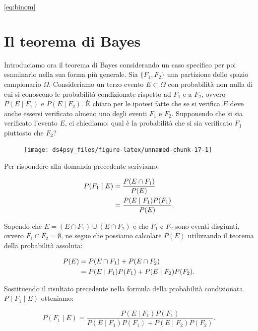 \documentclass[
  11pt,
]{krantz}
\theoremstyle{definition}
\theoremstyle{definition}
\theoremstyle{definition}
\theoremstyle{definition}
\theoremstyle{remark}
\begin{document}
\eqref{eq:binom}

\hypertarget{il-teorema-di-bayes}{%
\section{Il teorema di Bayes}\label{il-teorema-di-bayes}}

Introduciamo ora il teorema di Bayes considerando un caso specifico per poi esaminarlo nella sua forma più generale. Sia \(\{F_1, F_2\}\) una partizione dello spazio campionario \(\Omega\). Consideriamo un terzo evento \(E \subset \Omega\) con probabilità non nulla di cui si conoscono le probabilità condizionate rispetto ad \(F_1\) e a \(F_2\), ovvero \(P(E \mid F_1)\) e \(P(E \mid F_2)\). È chiaro per le ipotesi fatte che se si verifica \(E\) deve anche essersi verificato almeno uno degli eventi \(F_1\) e \(F_2\). Supponendo che si sia verificato l'evento \(E\), ci chiediamo: qual è la probabilità che si sia verificato \(F_1\) piuttosto che \(F_2\)?

\begin{figure}[h]

{\centering \texttt{[image: ds4psy\_files/figure-latex/unnamed-chunk-17-1]} 

}

\end{figure}

Per rispondere alla domanda precedente scriviamo:

\[
\begin{split}
P(F_1 \mid E) &= \frac{P(E \cap F_1)}{P(E)}\notag\\
              &= \frac{P(E \mid F_1)P(F_1)}{P(E)}.
\end{split}
\]

Sapendo che \(E = (E \cap F_1) \cup (E \cap F_2)\) e che \(F_1\) e \(F_2\) sono eventi disgiunti, ovvero \(F_1 \cap F_2 = \emptyset\), ne segue che possiamo calcolare \(P(E)\) utilizzando il teorema della probabilità assoluta:

\[
\begin{split}
P(E) &= P(E \cap F_1) + P(E \cap F_2)\notag\\
     &= P(E \mid F_1)P(F_1) + P(E \mid F_2)P(F_2).
\end{split}
\]

\noindent Sostituendo il risultato precedente nella formula della probabilità condizionata \(P(F_1 \mid E)\) otteniamo:

\begin{equation}
P(F_1 \mid E) = \frac{P(E \mid F_1)P(F_1)}{P(E \mid F_1)P(F_1) + P(E \mid F_2)P(F_2)}.
\label{eq:bayes1}
\end{equation}
\end{document}
